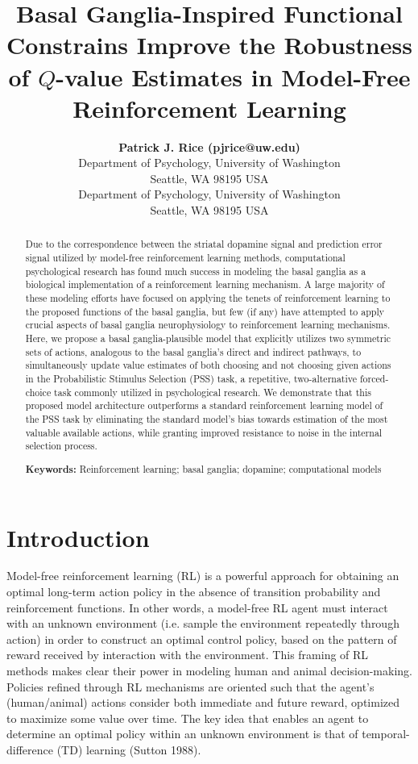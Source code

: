 \documentclass[10pt,letterpaper]{article}
\title{Basal Ganglia-Inspired Functional Constrains Improve the Robustness of $Q$-value Estimates in Model-Free Reinforcement Learning}
\author{{\large \bf Patrick J. Rice (pjrice@uw.edu)} \\
  Department of Psychology, University of Washington \\
  Seattle, WA 98195 USA
  \AND {\large \bf Andrea Stocco (stocco@uw.edu)} \\
  Department of Psychology, University of Washington \\
  Seattle, WA 98195 USA}
\begin{document}
\maketitle


\begin{abstract}
Due to the correspondence between the striatal dopamine signal and prediction error signal utilized by model-free reinforcement learning methods, computational psychological research has found much success in modeling the basal ganglia as a biological implementation of a reinforcement learning mechanism. A large majority of these modeling efforts have focused on applying the tenets of reinforcement learning to the proposed functions of the basal ganglia, but few (if any) have attempted to apply crucial aspects of basal ganglia neurophysiology to reinforcement learning mechanisms. Here, we propose a basal ganglia-plausible model that explicitly utilizes two symmetric sets of actions, analogous to the basal ganglia’s direct and indirect pathways, to simultaneously update value estimates of both choosing and not choosing given actions in the Probabilistic Stimulus Selection (PSS) task, a repetitive, two-alternative forced-choice task commonly utilized in psychological research. We demonstrate that this proposed model architecture outperforms a standard reinforcement learning model of the PSS task by eliminating the standard model’s bias towards estimation of the most valuable available actions, while granting improved resistance to noise in the internal selection process.

\textbf{Keywords:} 
Reinforcement learning; basal ganglia; dopamine; computational models
\end{abstract}


\section{Introduction}


Model-free reinforcement learning (RL) is a powerful approach for obtaining an optimal long-term action policy in the absence of transition probability and reinforcement functions. In other words, a model-free RL agent must interact with an unknown environment (i.e. sample the environment repeatedly through action) in order to construct an optimal control policy, based on the pattern of reward received by interaction with the environment. This framing of RL methods makes clear their power in modeling human and animal decision-making. Policies refined through RL mechanisms are oriented such that the agent’s (human/animal) actions consider both immediate and future reward, optimized to maximize some value over time. The key idea that enables an agent to determine an optimal policy within an unknown environment is that of temporal-difference (TD) learning (Sutton 1988). 
\end{document}
